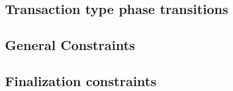 \subsection{Transaction type phase transitions}      \label{rlp txn v2: generalities: admissible rlp component flags}     
\subsection{General Constraints}                     \label{rlp txn v2: generalities: indices and limb constructed}       
\subsection{Finalization constraints}                \label{rlp txn v2: generalities: heartbeat}                          

